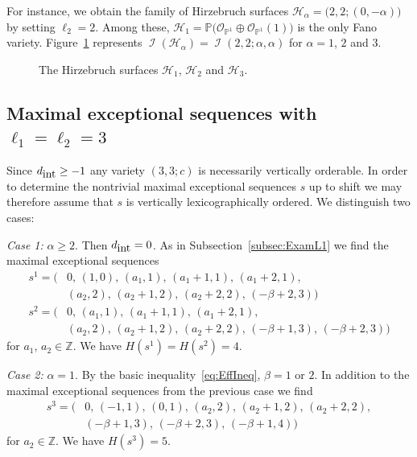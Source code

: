 \documentclass[11pt]{article}
\theoremstyle{definition}
\numberwithin{equation}{section}
\newcommand{\PP}{\mathbb P}
\newcommand{\Z}{\mathbb Z}
\newcommand{\CH}{{\mathcal H}}
\newcommand{\CI}{{\mathcal I}}
\newcommand{\CO}{{\mathcal O}}
\newcommand{\ko}{\overline}
\newcommand{\cb}{{\ko{c}}}
\newcommand{\nImm}{\operatorname{\CI}}
\newcommand{\xa}{\alpha}
\newcommand{\xb}{\beta}
\newcommand{\cl}{s}
\newcommand{\hZ}{d_{\mbox{\rm\tiny int}}}
\newcommand{\mes}{maximal exceptional sequence}
\newcommand{\ssect}[1]{Subsection~\ref{#1}}
\newcommand{\immreg}[4]{
\def\la{#1} 
\def\lb{#2} 
\def\ch{#3} 
\def\cb{#4} 
\draw[color=oliwkowy!40] (-\cb-0.3,-\la/\ch) grid (\la+0.3,\lb+\la/\ch);
\fill[pattern color=parallelogram, pattern=north west lines]
  (0,0) -- (\la,-\la/\ch) -- (\la,0) -- cycle
  (\la-\cb,\lb) -- (-\cb,\lb+\la/\ch) -- (-\cb,\lb) -- cycle;
\draw[thick, color=black]
  (0,0) -- (\la,-\la/\ch) -- (\la,0)
  (\la-\cb,\lb) -- (-\cb,\lb+\la/\ch) -- (-\cb,\lb);
\fill[pattern color=parallelogram, pattern=north west lines]
  (0,0) -- (-\cb,\cb/\ch) -- (-\cb,\lb) --
  (\la-\cb,\lb) -- (\la,\lb-\cb/\ch) -- (\la,0) -- cycle;
\fill[thick, color=origin]
  (0,0) circle (5pt);
\draw[thick, color=origin]
  (\la-\cb,\lb) circle (5pt)
  (-0.5,-0.5) node{$0$};
\foreach \xa in {-1,...,1}
\foreach \xb in {-\cb,...,\la}
\foreach \y in {2,...,\lb} {
  \fill[thick, color=regi]
    (\xa-\cb,\y-1) circle (5pt)
    (\xb+1,\y-1) circle (5pt); }
\pgfmathsetmacro{\hMax}{(\la-2)/\ch}
\foreach \y in {0,...,\hMax} {
  \pgfmathsetmacro{\wMax}{\la-\ch*\y-1}
  \foreach \x in {1,...,\wMax} {
    \fill[thick, color=regii]
      (\la-\x,-\y) circle (5pt)
      (\x-\cb,\y+\lb) circle (5pt); }}
\foreach \x in {2,...,\la} {
  \fill[thick, color=regii]
  (\x-1,0) circle (5pt)
  (\la-\cb-\x+1,\lb) circle (5pt); }
}
\begin{document}
For instance, {we obtain the family 
of Hirzebruch surfaces 
$\CH_{\xa}=\big(2,2;(0,-\xa)\big)$ by setting $\ell_2=2$}. 
Among these, $\CH_1=\PP\big(\CO_{\PP^1}\oplus
\CO_{\PP^1}(1)\big)$ is the only Fano variety. 
Figure~\ref{fig:Hirzebruch} represents 
$\nImm(\CH_{\xa})=\nImm(2,2;\xa,\xa)$ for 
$\xa=1$, $2$ and $3$.
\begin{figure}
\newcommand{\scaleA}{0.4}
\newcommand{\spaceA}{\hspace*{3em}}
\spaceA
{}
\spaceA
{}
\caption{The Hirzebruch surfaces $\CH_1$, 
$\CH_2$ and $\CH_3$.}
\label{fig:Hirzebruch}
\end{figure}

\subsection{Maximal exceptional sequences 
with \texorpdfstring{$\ell_1=\ell_2=3$}{l1=l2=3}}\label{subsec:Exam33}
Since $\hZ\geq -1$ any variety $(3,3;c)$ 
is necessarily vertically orderable. In 
order to determine the nontrivial {\mes}s 
$\cl$ up to shift we may therefore assume 
that $\cl$ is vertically lexicographically 
ordered. We distinguish two cases:

{\em Case 1:} $\xa\geq2$. Then $\hZ=0$. 
As in \ssect{subsec:ExamL1} we find the 
{\mes}s
\begin{align*}
\cl^1=\big(& 0,\,(1,0),\,(a_1,1),
\,(a_1+1,1),\,(a_1+2,1),\\
&(a_2,2),\,(a_2+1,2),\,(a_2+2,2),
\,(-\xb+2,3)\big)\\\cl^2=\big(& 0,\,(a_1,1),
\,(a_1+1,1),\,(a_1+2,1),\\
&(a_2,2),\,(a_2+1,2),\,(a_2+2,2),\,(-\xb+1,3),
\,(-\xb+2,3)\big)
\end{align*}
for $a_1$, $a_2\in\Z$. We have $H(\cl^1)=H(\cl^2)=4$.

{\em Case 2:} $\xa=1$. By the basic 
inequality~\eqref{eq:EffIneq}, $\xb=1$ or $2$. 
In addition to the {\mes}s from the previous 
case we find
\begin{align*}
\cl^3=\big(&0,\,(-1,1),\,(0,1),\,(a_2,2),
\,(a_2+1,2),\,(a_2+2,2),\\
&(-\xb+1,3),\,(-\xb+2,3),\,(-\xb+1,4)\big)
\end{align*}
for $a_2\in\Z$. We have $H(\cl^3)=5$.
\end{document}

